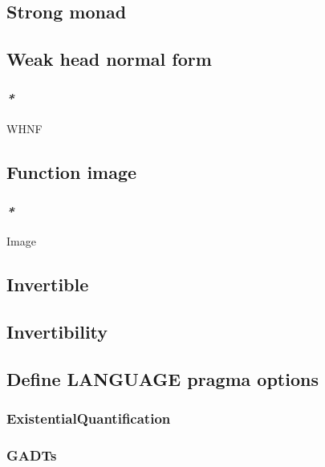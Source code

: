 \documentclass[11pt]{article}
\begin{document}
\subsection{\label{orgf1b786a}Strong monad}
\label{sec:org6937d32}

\subsection{\label{org571b150}Weak head normal form}
\label{sec:org7e64eda}

\subsubsection{\emph{*}}
\label{sec:org438abde}

\label{org18fb8d4}WHNF\\

\subsection{\label{org0c03b7a}Function image}
\label{sec:orgb4e93ff}

\subsubsection{\emph{*}}
\label{sec:org9e2d749}

\label{orgeb43f0e}Image\\

\subsection{\label{org4e8c15d}Invertible}
\label{sec:orge946d38}
\subsection{\label{org60129ed}Invertibility}
\label{sec:org51eacc2}
\subsection{\label{orgc73686e}Define LANGUAGE pragma options}
\label{sec:org2b8fc88}

\subsubsection{\label{orgbfc2dfb}ExistentialQuantification}
\label{sec:orgea2dc60}

\subsubsection{\label{org04473bc}GADTs}
\label{sec:orgff8726d}
\end{document}

